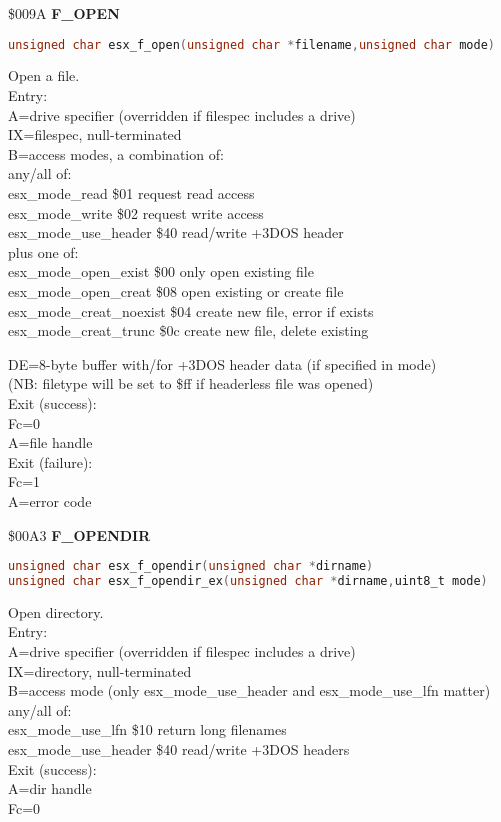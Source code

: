 \$009A \textbf{F\_OPEN}

\begin{lstlisting}[language=C]
unsigned char esx_f_open(unsigned char *filename,unsigned char mode)
\end{lstlisting}

Open a file.\\
Entry:\\
A=drive specifier (overridden if filespec includes a drive)\\
IX=filespec, null-terminated\\
B=access modes, a combination of:\\
any/all of:\\
esx\_mode\_read \$01 request read access\\
esx\_mode\_write \$02 request write access\\
esx\_mode\_use\_header \$40 read/write +3DOS header\\
plus one of:\\
esx\_mode\_open\_exist \$00 only open existing file\\
esx\_mode\_open\_creat \$08 open existing or create file\\
esx\_mode\_creat\_noexist \$04 create new file, error if exists\\
esx\_mode\_creat\_trunc \$0c create new file, delete existing

DE=8-byte buffer with/for +3DOS header data (if specified in mode)\\
(NB: filetype will be set to \$ff if headerless file was opened)\\
Exit (success):\\
Fc=0\\
A=file handle\\
Exit (failure):\\
Fc=1\\
A=error code

\$00A3 \textbf{F\_OPENDIR}

\begin{lstlisting}[language=C]
unsigned char esx_f_opendir(unsigned char *dirname)
unsigned char esx_f_opendir_ex(unsigned char *dirname,uint8_t mode)
\end{lstlisting}

Open directory.\\
Entry:\\
A=drive specifier (overridden if filespec includes a drive)\\
IX=directory, null-terminated\\
B=access mode (only esx\_mode\_use\_header and esx\_mode\_use\_lfn matter)\\
any/all of:\\
esx\_mode\_use\_lfn \$10 return long filenames\\
esx\_mode\_use\_header \$40 read/write +3DOS headers\\
Exit (success):\\
A=dir handle\\
Fc=0

